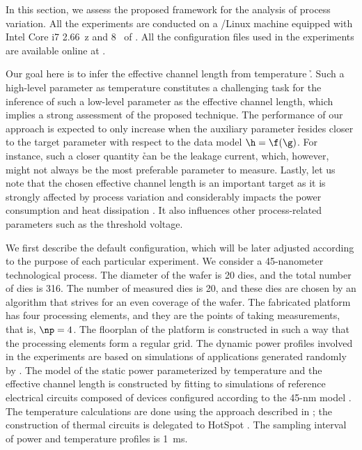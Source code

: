 In this section, we assess the proposed framework for the analysis of process
variation. All the experiments are conducted on a /Linux machine
equipped with Intel Core i7 2.66~z and 8~ of . All the
configuration files used in the experiments are available online at
\cite{eslab2014a}.

Our goal here is to infer the effective channel length \g from temperature \h.
Such a high-level parameter as temperature constitutes a challenging task for
the inference of such a low-level parameter as the effective channel length,
which implies a strong assessment of the proposed technique. The performance of
our approach is expected to only increase when the auxiliary parameter \h
resides closer to the target parameter \g with respect to the data model $\h =
\f(\g)$. For instance, such a closer quantity \h can be the leakage current,
which, however, might not always be the most preferable parameter to measure.
Lastly, let us note that the chosen effective channel length is an important
target as it is strongly affected by process variation and considerably impacts
the power consumption and heat dissipation \cite{chandrakasan2000,
srivastava2010, juan2011, juan2012}. It also influences other process-related
parameters such as the threshold voltage.

We first describe the default configuration, which will be later adjusted
according to the purpose of each particular experiment. We consider a
45-nanometer technological process. The diameter of the wafer is 20 dies, and
the total number of dies \nd is 316. The number of measured dies \hnd is 20, and
these dies are chosen by an algorithm that strives for an even coverage of the
wafer. The fabricated platform has four processing elements, and they are the
points of taking measurements, that is, $\np = 4$. The floorplan of the platform
is constructed in such a way that the processing elements form a regular grid.
The dynamic power profiles involved in the experiments are based on simulations
of applications generated randomly by  \cite{dick1998}. The model of
the static power parameterized by temperature and the effective channel length
is constructed by fitting to  simulations of reference electrical
circuits composed of  devices \cite{bsim} configured according to the
45-nm   model \cite{ptm}. The temperature calculations are done
using the approach described in ; the
construction of thermal  circuits is delegated to HotSpot
\cite{skadron2003}. The sampling interval of power and temperature profiles is
1~ms.

